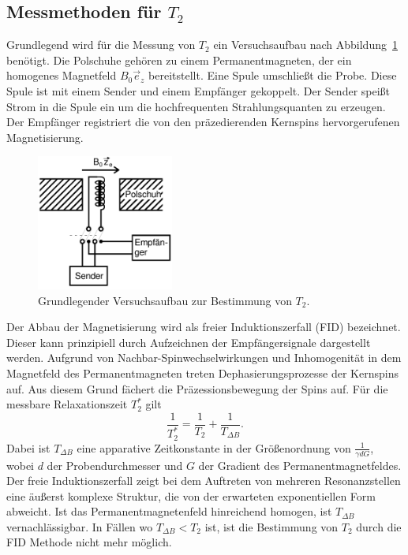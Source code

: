\subsection{Messmethoden für $T_2$}

Grundlegend wird für die Messung von $T_2$ ein Versuchsaufbau nach
Abbildung~\ref{fig:aufbau} benötigt. Die Polschuhe gehören zu einem
Permanentmagneten, der ein homogenes Magnetfeld $B_0\vec{e}_z$
bereitstellt. Eine Spule umschließt die Probe.
Diese Spule ist mit einem Sender und einem Empfänger gekoppelt.
Der Sender speißt Strom in die Spule ein um die
hochfrequenten Strahlungsquanten zu erzeugen.
Der Empfänger registriert die von den präzedierenden Kernspins
hervorgerufenen Magnetisierung.
\begin{figure}
  \centering
  \includegraphics[width = 0.4\textwidth]{Pics/aufbau.pdf}
  \caption{Grundlegender Versuchsaufbau zur Bestimmung von $T_2$\cite{anleitung}.}
  \label{fig:aufbau}
\end{figure}
Der Abbau der Magnetisierung wird als freier Induktionszerfall (FID)
bezeichnet. Dieser kann prinzipiell durch Aufzeichnen der
Empfängersignale dargestellt werden.
Aufgrund von Nachbar-Spinwechselwirkungen und Inhomogenität in dem Magnetfeld des
Permanentmagneten treten Dephasierungsprozesse der Kernspins auf.
Aus diesem Grund fächert die Präzessionsbewegung der Spins
auf. Für die messbare Relaxationszeit $T^*_2$ gilt
\begin{equation}
  \label{eqn:T^*}
  \frac{1}{T^*_2} = \frac{1}{T_2} + \frac{1}{T_{\Delta B}}.
\end{equation}
Dabei ist $T_{\Delta B}$ eine apparative Zeitkonstante in der
Größenordnung von $\frac{1}{\gamma d G}$, wobei $d$ der Probendurchmesser
und $G$ der Gradient des Permanentmagnetfeldes.
Der freie Induktionszerfall zeigt bei dem Auftreten von mehreren
Resonanzstellen eine äußerst komplexe Struktur, die von der erwarteten
exponentiellen Form abweicht.
Ist das Permanentmagnetenfeld hinreichend homogen, ist
$T_{\Delta B}$ vernachlässigbar. In Fällen wo $T_{\Delta B} < T_2$
ist, ist die Bestimmung von $T_2$ durch die FID Methode nicht mehr möglich.

